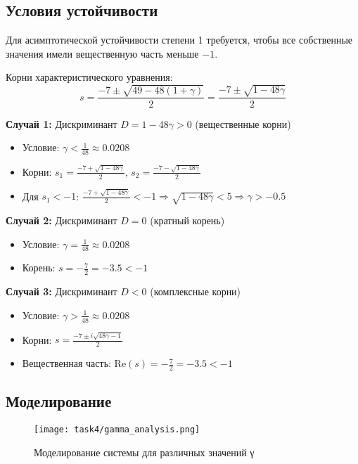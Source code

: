 \subsection{Условия устойчивости}

Для асимптотической устойчивости степени 1 требуется, чтобы все собственные значения имели вещественную часть меньше $-1$.

Корни характеристического уравнения:
\begin{equation}
s = \frac{-7 \pm \sqrt{49 - 48(1+\gamma)}}{2} = \frac{-7 \pm \sqrt{1-48\gamma}}{2}
\end{equation}

\textbf{Случай 1:} Дискриминант $D = 1 - 48\gamma > 0$ (вещественные корни)
\begin{itemize}
\item Условие: $\gamma < \frac{1}{48} \approx 0.0208$
\item Корни: $s_1 = \frac{-7 + \sqrt{1-48\gamma}}{2}$, $s_2 = \frac{-7 - \sqrt{1-48\gamma}}{2}$
\item Для $s_1 < -1$: $\frac{-7 + \sqrt{1-48\gamma}}{2} < -1 \Rightarrow \sqrt{1-48\gamma} < 5 \Rightarrow \gamma > -0.5$
\end{itemize}

\textbf{Случай 2:} Дискриминант $D = 0$ (кратный корень)
\begin{itemize}
\item Условие: $\gamma = \frac{1}{48} \approx 0.0208$
\item Корень: $s = -\frac{7}{2} = -3.5 < -1$
\end{itemize}

\textbf{Случай 3:} Дискриминант $D < 0$ (комплексные корни)
\begin{itemize}
\item Условие: $\gamma > \frac{1}{48} \approx 0.0208$
\item Корни: $s = \frac{-7 \pm i\sqrt{48\gamma-1}}{2}$
\item Вещественная часть: $\text{Re}(s) = -\frac{7}{2} = -3.5 < -1$
\end{itemize}

\subsection{Моделирование}

\begin{figure}[H]
\centering
\texttt{[image: task4/gamma\_analysis.png]}
\caption{Моделирование системы для различных значений γ}
\label{fig:gamma_analysis}
\end{figure}

